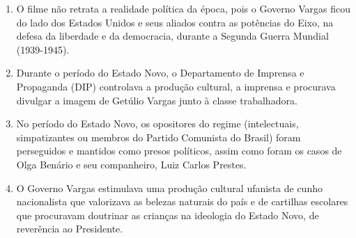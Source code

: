 \begin{enumerate}
\item O filme não retrata a realidade política da época, pois o Governo Vargas ficou do lado dos Estados Unidos
        e seus aliados contra as potências do Eixo, na defesa da liberdade e da democracia, durante a Segunda
        Guerra Mundial (1939-1945).
\item Durante o período do Estado Novo, o Departamento de Imprensa e Propaganda (DIP) controlava a
        produção cultural, a imprensa e procurava divulgar a imagem de Getúlio Vargas junto à classe
        trabalhadora.
\item No período do Estado Novo, os opositores do regime (intelectuais, simpatizantes ou membros do Partido
        Comunista do Brasil) foram perseguidos e mantidos como presos políticos, assim como foram os casos de
        Olga Benário e seu companheiro, Luiz Carlos Prestes.
\item O Governo Vargas estimulava uma produção cultural ufanista de cunho nacionalista que valorizava as
        belezas naturais do país e de cartilhas escolares que procuravam doutrinar as crianças na ideologia do
        Estado Novo, de reverência ao Presidente.\end{enumerate}
